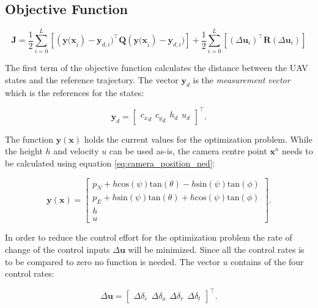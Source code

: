 \subsection{Objective Function}

\begin{equation}
	\label{eq:objective_function}
	\mathbf{J} = \frac{1}{2} \sum_{i=0}^{L} [(\mathbf{y(\mathbf{x}}_i)-\mathbf{y}_{d,i})^\intercal \mathbf{Q}(\mathbf{y(\mathbf{x}}_i)-\mathbf{y}_{d,i})] + \frac{1}{2}\sum_{i=0}^{L}[(\Delta\mathbf{u}_i)^\intercal \mathbf{R}(\Delta\mathbf{u}_i)]
\end{equation}

The first term of the objective function calculates the distance between the UAV states and the reference trajectory. The vector $\mathbf{y}_d$ is the \textit{measurement vector} which is the references for the states:
	
\begin{equation}
	\mathbf{y}_d =
	\begin{bmatrix}
		{c_x}_d \hspace{5pt} {c_y}_d \hspace{5pt} h_d \hspace{5pt} u_d
	\end{bmatrix}^\intercal .
\end{equation}

The function $\mathbf{y}(\mathbf{x})$ holds the current values for the optimization problem. While the height $h$ and velocity $u$ can be used as-is, the camera centre point $\mathbf{x}^n$ needs to be calculated using equation \ref{eq:camera_position_ned}:

\begin{equation}
	\mathbf{y}(\mathbf{x}) =
	\begin{bmatrix}
		p_N + h\text{cos}(\psi)\text{tan}(\theta) - h\text{sin}(\psi)\text{tan}(\phi)\\
		p_E + h\text{sin}(\psi)\text{tan}(\theta) + h\text{cos}(\psi)\text{tan}(\phi)\\
		h \\
		u
	\end{bmatrix}.
\end{equation}

In order to reduce the control effort for the optimization problem the rate of change of the control inputs $\Delta\mathbf{u}$ will be minimized. Since all the control rates is to be compared to zero no function is needed. The vector $u$ contains of the four control rates:

\begin{equation}
	\label{eq:control_rates}
	\Delta\mathbf{u} = 
	\begin{bmatrix}
		\Delta\delta_e \hspace{5pt} \Delta\delta_a \hspace{5pt} \Delta\delta_r \hspace{5pt} \Delta\delta_t
	\end{bmatrix} ^\intercal .
\end{equation}

